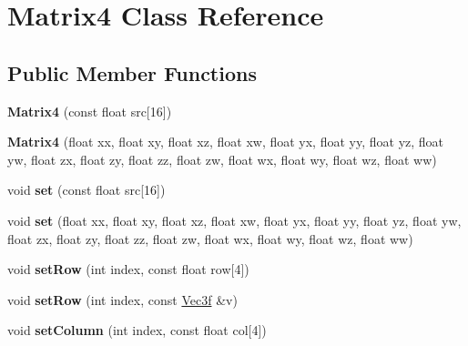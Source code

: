 \hypertarget{class_matrix4}{}\section{Matrix4 Class Reference}
\label{class_matrix4}
\subsection*{Public Member Functions}
\begin{DoxyCompactItemize}
\item 
\mbox{\label{class_matrix4_a5aa337a51c2ea4e08bb6fdb46bac4007}} 
{\bfseries Matrix4} (const float src\mbox{[}16\mbox{]})
\item 
\mbox{\label{class_matrix4_a79283dde33d6c1eabbafdb9deec41c19}} 
{\bfseries Matrix4} (float xx, float xy, float xz, float xw, float yx, float yy, float yz, float yw, float zx, float zy, float zz, float zw, float wx, float wy, float wz, float ww)
\item 
\mbox{\label{class_matrix4_af8b9f45c14e981509d141d00a0d87a6c}} 
void {\bfseries set} (const float src\mbox{[}16\mbox{]})
\item 
\mbox{\label{class_matrix4_a043609890084209a0bca280826a987e3}} 
void {\bfseries set} (float xx, float xy, float xz, float xw, float yx, float yy, float yz, float yw, float zx, float zy, float zz, float zw, float wx, float wy, float wz, float ww)
\item 
\mbox{\label{class_matrix4_ac516425bfa040853a4bb61ecc0e26d83}} 
void {\bfseries set\+Row} (int index, const float row\mbox{[}4\mbox{]})
\item 
\mbox{\label{class_matrix4_a37923fa6fc00df9f3358cf2cae135773}} 
void {\bfseries set\+Row} (int index, const \hyperlink{struct_vec3f}{Vec3f} \&v)
\item 
\mbox{\label{class_matrix4_ab4fc658fab1f55c57177985114026c60}} 
void {\bfseries set\+Column} (int index, const float col\mbox{[}4\mbox{]})
\item 
\mbox{\label{class_matrix4_ad40fe940b9977bf5ee4da8e293d531e8}} 

\end{DoxyCompactItemize}
